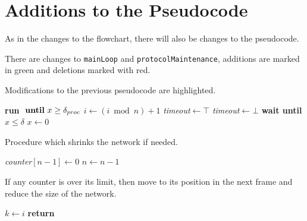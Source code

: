 \newpage
\section{Additions to the Pseudocode}
As in the changes to the flowchart, there will also be changes to the pseudocode. 

There are changes to \texttt{mainLoop} and \texttt{protocolMaintenance}, additions are marked in green and deletions marked with red.

\begin{algorithm}[H]
\caption{Modifications to the previous pseudocode are highlighted.}
\label{lst:general_case2}
\begin{algorithmic}[1]
    \Repeat
        \State \textbf{run}  $\text{ \textbf{until} }x \ge \delta_{proc}$ 
        \State $i \gets (i \bmod n) + 1$  
                \CState {}
            \CEndIf
            \State {} 
            \State {}
                \CState {}
            \CEndIf
        \Else
            \CState \textit{timeout}$ \gets \top$
                    \State {}
                    \State {}
                    \CState \textit{timeout}$ \gets \bot$
                \EndIf
            \EndWhile
            \CState {}
        \EndIf
        \State \textbf{wait until } $x \le \delta$
        \State $x \gets 0$ 
\EndProcedure
\end{algorithmic}    
\end{algorithm}

\begin{algorithm}[H]
\caption{Procedure which shrinks the network if needed.}
\label{lst:general_case5}
\begin{algorithmic}[1]
        \State \textit{counter}$[n-1] \gets 0$
        \State $n \gets n - 1$
    \EndIf
\EndProcedure
\end{algorithmic}    
\end{algorithm} 

\begin{algorithm}[H]
\caption{If any counter is over its limit, then move to its position in the next frame and reduce the size of the network.}
\label{lst:general_case4}
\begin{algorithmic}[1]
            \State $k \gets i$
            \State \textbf{return}
        \EndIf
    \EndFor 
\EndProcedure
\end{algorithmic}    
\end{algorithm} 

